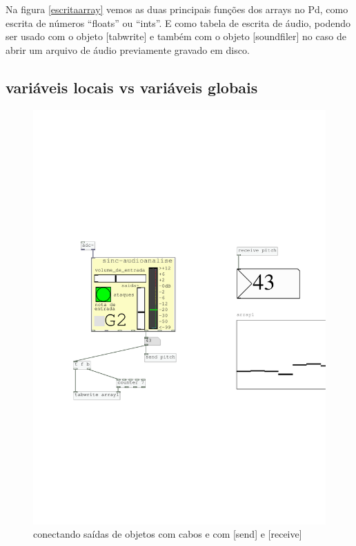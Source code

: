 \documentclass{ppgmus}
\begin{document}
Na figura \ref{escritaarray} vemos as duas principais funções dos arrays
no Pd, como escrita de números ``floats'' ou ``ints''. E como tabela de escrita
de áudio, podendo ser usado com o objeto [tabwrite\texttildelow] e também
com o objeto [soundfiler] no caso de abrir um arquivo de áudio previamente
gravado em disco.







\subsection{variáveis locais vs variáveis globais}

\begin{figure}
\includegraphics[scale=.6]{ex-conexoes}
\caption{conectando saídas de objetos com cabos e com [send] e [receive]}
\label{ex-conexoes}
\end{figure}
\end{document}
